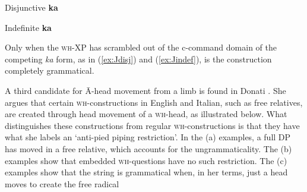 \documentclass[output=paper,colorlinks,citecolor=brown,
]{langscibook}
\begin{document}
\ea Disjunctive \textbf{ka} \label{ex:disjunctiveka}
\z
\z

\ea Indefinite \textbf{ka} \label{ex:indefiniteka}
\z
\z

Only when the \textsc{wh}-XP has scrambled out of the c-command domain of the competing \textit{ka} form, as in (\ref{ex:Jdisj}) and (\ref{ex:Jindef}), is the construction completely grammatical.

A third candidate for \=A-head movement from a limb is found in Donati \citeyearpar{Donati:2006}.  She argues that certain \textsc{wh}-constructions in English and Italian, such as free relatives, are created through head movement of a \textsc{wh}-head, as illustrated below.  What distinguishes these constructions from regular \textsc{wh}-constructions is that they have what she labels an `anti-pied piping restriction'.  In the (a) examples, a full DP has moved in a free relative, which accounts for the ungrammaticality.  The (b) examples show that embedded \textsc{wh}-questions have no such restriction. The (c) examples show that the string is grammatical when, in her terms, just a head moves to create the free radical

\ea 
{}
\z
\z
\end{document}
